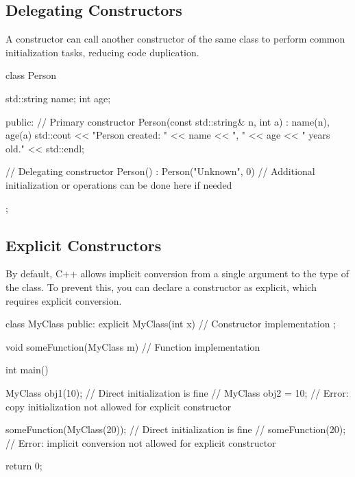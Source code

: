 \documentclass{report}
\begin{document}
    \bigbreak \noindent 
    \subsection{Delegating Constructors}
    \bigbreak \noindent 
    \begin{concept}
        A constructor can call another constructor of the same class to perform common initialization tasks, reducing code duplication.
    \end{concept}
    \bigbreak \noindent 
    \begin{cppcode}
class Person {
    std::string name;
    int age;

public:
    // Primary constructor
    Person(const std::string& n, int a) : name(n), age(a) {
        std::cout << "Person created: " << name << ", " << age << " years old." << std::endl;
    }

    // Delegating constructor
    Person() : Person("Unknown", 0) {
        // Additional initialization or operations can be done here if needed
    }
};
    \end{cppcode}
    

    \bigbreak \noindent 
    \subsection{Explicit Constructors}
    \bigbreak \noindent 
    \begin{concept}
         By default, C++ allows implicit conversion from a single argument to the type of the class. To prevent this, you can declare a constructor as explicit, which requires explicit conversion.
    \end{concept}
    \bigbreak \noindent 
    \begin{cppcode}
class MyClass {
public:
    explicit MyClass(int x) {
        // Constructor implementation
    }
};

void someFunction(MyClass m) {
    // Function implementation
}

int main() {
    MyClass obj1(10); // Direct initialization is fine
    // MyClass obj2 = 10; // Error: copy initialization not allowed for explicit constructor

    someFunction(MyClass(20)); // Direct initialization is fine
    // someFunction(20); // Error: implicit conversion not allowed for explicit constructor

    return 0;
}   \end{cppcode}
    

    \pagebreak \bigbreak \noindent 
\end{document}
